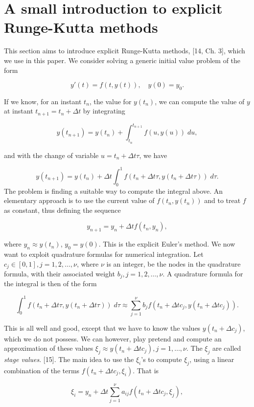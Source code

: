 \documentclass[
  letterpaper,
]{report}
\theoremstyle{definition}
\theoremstyle{plain}
\theoremstyle{definition}
\theoremstyle{remark}
\begin{document}
\section{A small introduction to explicit Runge-Kutta
methods}\label{a-small-introduction-to-explicit-runge-kutta-methods}

This section aims to introduce explicit Runge-Kutta methods, {[}14, Ch.
3{]}, which we use in this paper. We consider solving a generic initial
value problem of the form

\[
y'(t) = f(t,y(t)), \quad y(0) = y_0.
\]

If we know, for an instant \(t_n\), the value for \(y(t_n)\), we can
compute the value of \(y\) at instant \(t_{n+1} = t_n +\Delta t\) by
integrating

\[
y(t_{n+1}) = y(t_n) + \int_{t_n}^{t_{n+1}}f(u,y(u))\; du,
\]

and with the change of variable \(u = t_n + \Delta t\tau\), we have

\[
y(t_{n+1}) = y(t_n) + \Delta t\int_0^1f(t_n+\Delta t\tau,y(t_n+\Delta t\tau)) \; d\tau.
\] The problem is finding a suitable way to compute the integral above.
An elementary approach is to use the current value of \(f(t_n,y(t_n))\)
and to treat \(f\) as constant, thus defining the sequence

\[
y_{n+1} = y_n + \Delta tf(t_n,y_n),
\]

where \(y_{n} \approx y(t_{n})\), \(y_0 = y(0)\). This is the explicit
Euler's method. We now want to exploit quadrature formulas for numerical
integration. Let \(c_j \in [0,1], j=1,2,\dots, \nu\), where \(\nu\) is
an integer, be the nodes in the quadrature formula, with their
associated weight \(b_j, j=1,2,\dots, \nu\). A quadrature formula for
the integral is then of the form

\[
\int_0^1 f(t_n+\Delta t \tau,y(t_n+\Delta t\tau))\; d\tau \approx \sum_{j=1}^\nu b_j f(t_n + \Delta t c_j,y(t_n+\Delta t c_j)).
\]

This is all well and good, except that we have to know the values
\(y(t_n+\Delta c_j)\), which we do not possess. We can however, play
pretend and compute an approximation of these values
\(\xi_j \approx y(t_n+\Delta t c_j), j=1,\dots, \nu\). The \(\xi_j\) are
called \emph{stage values}. {[}15{]}. The main idea to use the
\(\xi_i\)'s to compute \(\xi_j\), using a linear combination of the
terms \(f(t_n + \Delta t c_j, \xi_i)\). That is

\[
\xi_i = y_n + \Delta t \sum_{j=1}^\nu a_{ij}f(t_n+\Delta t c_j, \xi_j),
\]
\end{document}
